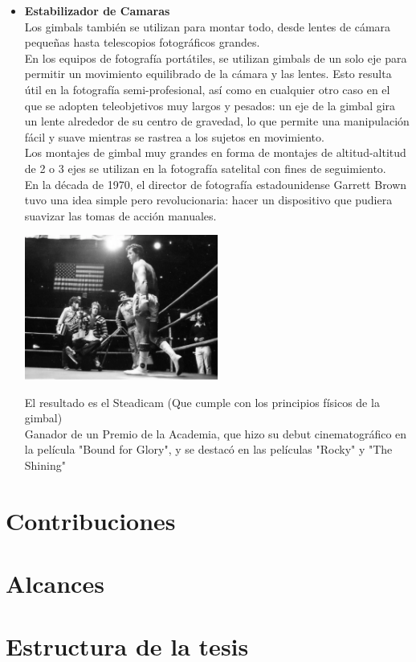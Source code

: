 \begin{itemize}
    \item \textbf{Estabilizador de Camaras}\\
    Los gimbals también se utilizan para montar todo, desde lentes de cámara pequeñas 
    hasta telescopios fotográficos grandes.\\
    En los equipos de fotografía portátiles, se utilizan gimbals de un 
    solo eje para permitir un movimiento equilibrado de la cámara y las lentes. 
    Esto resulta útil en la fotografía semi-profesional, así como en cualquier otro 
    caso en el que se adopten teleobjetivos muy largos y pesados: un eje de la gimbal 
    gira un lente alrededor de su centro de gravedad, lo que permite una manipulación 
    fácil y suave mientras se rastrea a los sujetos en movimiento.\\
    Los montajes de gimbal muy grandes en forma de montajes de altitud-altitud de 2 o 3 ejes 
    se utilizan en la fotografía satelital con fines de seguimiento.\\
    En la década de 1970, el director de fotografía estadounidense Garrett Brown tuvo 
    una idea simple pero revolucionaria: hacer un dispositivo que pudiera suavizar las 
    tomas de acción manuales. 
    \begin{center}
        \includegraphics[width=0.5\textwidth]{Capitulo1/Fig4.eps}       
        \label{Fig4}
    \end{center}

    El resultado es el Steadicam (Que cumple con los principios físicos de la gimbal) \\
    Ganador de un Premio de la Academia, que hizo su debut cinematográfico en la 
    película "Bound for Glory", y se destacó en las películas "Rocky" y "The Shining"


\end{itemize}

\section{Contribuciones}

\section{Alcances}


\section{Estructura de la tesis}